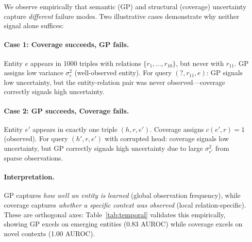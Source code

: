 We observe empirically that semantic (GP) and structural (coverage) uncertainty capture \emph{different} failure modes.
Two illustrative cases demonstrate why neither signal alone suffices:

\paragraph{Case 1: Coverage succeeds, GP fails.}
Entity $e$ appears in 1000 triples with relations $\{r_1, \ldots, r_{10}\}$, but never with $r_{11}$.
GP assigns low variance $\sigma^2_e$ (well-observed entity).
For query $(?, r_{11}, e)$: GP signals low uncertainty, but the entity-relation pair was never observed---coverage correctly signals high uncertainty.

\paragraph{Case 2: GP succeeds, Coverage fails.}
Entity $e'$ appears in exactly one triple $(h, r, e')$.
Coverage assigns $c(e', r) = 1$ (observed).
For query $(h', r, e')$ with corrupted head: coverage signals low uncertainty, but GP correctly signals high uncertainty due to large $\sigma^2_{e'}$ from sparse observations.

\paragraph{Interpretation.}
GP captures \emph{how well an entity is learned} (global observation frequency), while coverage captures \emph{whether a specific context was observed} (local relation-specific).
These are orthogonal axes: Table~\ref{tab:temporal} validates this empirically, showing GP excels on emerging entities (0.83 AUROC) while coverage excels on novel contexts (1.00 AUROC).
